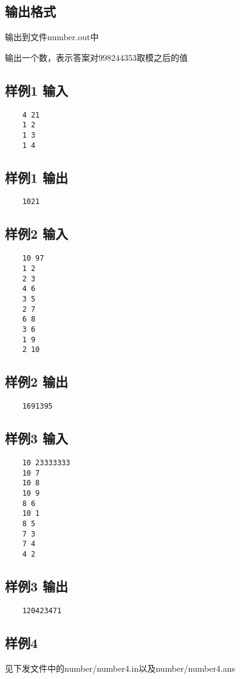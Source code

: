 \documentclass[12pt]{article}
\begin{document}
	\subsection{输出格式}
	输出到文件number.out中\par
	输出一个数，表示答案对$998244353$取模之后的值\par
	\subsection{样例1 输入}
	\begin{lstlisting}
    4 21
    1 2
    1 3
    1 4	
	\end{lstlisting}
	\subsection{样例1 输出}
	\begin{lstlisting}
    1021	
	\end{lstlisting}
	\subsection{样例2 输入}
	\begin{lstlisting}
    10 97
    1 2
    2 3
    4 6
    3 5
    2 7
    6 8
    3 6
    1 9
    2 10		
	\end{lstlisting}
	\subsection{样例2 输出}
	\begin{lstlisting}
    1691395	
	\end{lstlisting}
	\subsection{样例3 输入}
	\begin{lstlisting}
    10 23333333
    10 7
    10 8
    10 9
    8 6
    10 1
    8 5
    7 3
    7 4
    4 2	
	\end{lstlisting}
	\subsection{样例3 输出}
	\begin{lstlisting}
    120423471	
	\end{lstlisting}
	\subsection{样例4}
	见下发文件中的number/number4.in以及number/number4.ans\par
\end{document}
